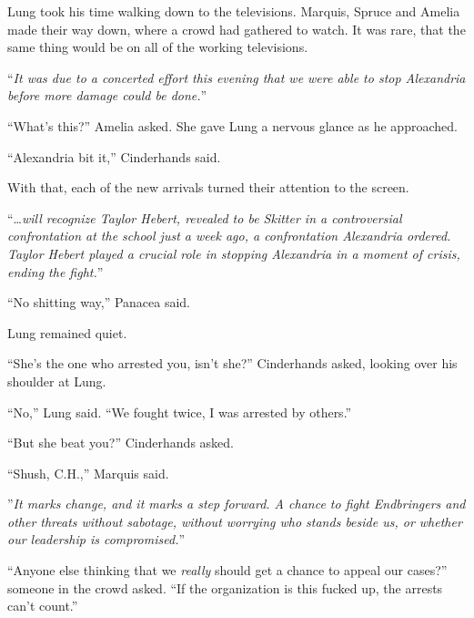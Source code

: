 Lung took his time walking down to the televisions.  Marquis, Spruce and Amelia made their way down, where a crowd had gathered to watch.  It was rare, that the same thing would be on all of the working televisions.



``\emph{It was due to a concerted effort this evening that we were able to stop Alexandria before more damage could be done.}''



``What's this?'' Amelia asked.  She gave Lung a nervous glance as he approached.



``Alexandria bit it,'' Cinderhands said.



With that, each of the new arrivals turned their attention to the screen.



``\ldots\emph{will recognize Taylor Hebert, revealed to be Skitter in a controversial confrontation at the school just a week ago, a confrontation Alexandria ordered.  Taylor Hebert played a crucial role in stopping Alexandria in a moment of crisis, ending the fight.}''



``No shitting way,'' Panacea said.



Lung remained quiet.



``She's the one who arrested you, isn't she?'' Cinderhands asked, looking over his shoulder at Lung.



``No,'' Lung said.  ``We fought twice, I was arrested by others.''



``But she beat you?''  Cinderhands asked.



``Shush, C.H.,'' Marquis said.



''\emph{It marks change, and it marks a step forward.  A chance to fight Endbringers and other threats without sabotage, without worrying who stands beside us, or whether our leadership is compromised.}''



``Anyone else thinking that we \emph{really} should get a chance to appeal our cases?''  someone in the crowd asked.  ``If the organization is this fucked up, the arrests can't count.''



